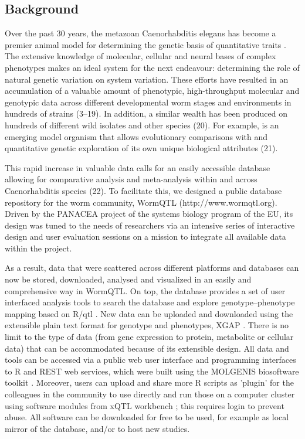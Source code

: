 \subsection{Background}
Over the past 30 years, the metazoan Caenorhabditis elegans has become a premier animal model for 
determining the genetic basis of quantitative traits \cite{Gaertner:2010, Kammenga:2008}. The 
extensive knowledge of molecular, cellular and neural bases of complex phenotypes makes 
 an ideal system for the next endeavour: determining the role of natural genetic 
variation on system variation. These efforts have resulted in an accumulation of a valuable amount 
of phenotypic, high-throughput molecular and genotypic data across different developmental worm 
stages and environments in hundreds of strains (3–19). In addition, a similar wealth has been 
produced on hundreds of different  wild isolates and other species (20). 
For example,  is an emerging model organism that allows evolutionary comparisons 
with  and quantitative genetic exploration of its own unique biological 
attributes (21).

This rapid increase in valuable data calls for an easily accessible database allowing for 
comparative analysis and meta-analysis within and across Caenorhabditis species (22). To 
facilitate this, we designed a public database repository for the worm community, WormQTL 
(http://www.wormqtl.org). Driven by the PANACEA project of the systems biology program of 
the EU, its design was tuned to the needs of  researchers via an intensive 
series of interactive design and user evaluation sessions on a mission to integrate all 
available data within the project.

As a result, data that were scattered across different platforms and databases can now be 
stored, downloaded, analysed and visualized in an easily and comprehensive way in WormQTL. 
On top, the database provides a set of user interfaced analysis tools to search the database 
and explore genotype–phenotype mapping based on R/qtl \cite{Broman:2003, Arends:2010}. New 
data can be uploaded and downloaded using the extensible plain text format for genotype and 
phenotypes, XGAP \cite{Swertz:2010a}. There is no limit to the type of data (from gene 
expression to protein, metabolite or cellular data) that can be accommodated because of its 
extensible design. All data and tools can be accessed via a public web user interface and 
programming interfaces to R and REST web services, which were built using the MOLGENIS 
biosoftware toolkit \cite{Swertz:2010b}. Moreover, users can upload and share more R 
scripts as 'plugin' for the colleagues in the community to use directly and run those on a 
computer cluster using software modules from xQTL workbench \cite{Arends:2012a, Snoek:2012}; this requires 
login to prevent abuse. All software can be downloaded for free to be used, for example as 
local mirror of the database, and/or to host new studies.


